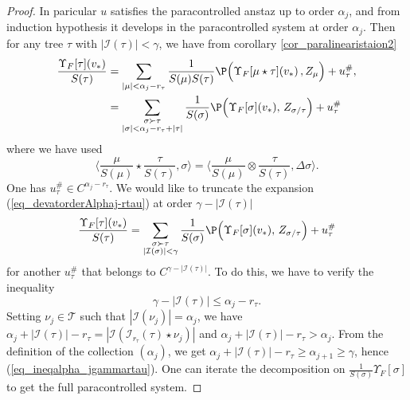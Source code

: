 \documentclass[11pt]{preprint}
\newcommand{\mcI}{\mathcal{I}}
\newcommand{\mcT}{\mathcal{T}}
\def\eqref#1{(\ref{#1})}
\begin{document}
\begin{proof}
	In paricular $u$ satisfies the paracontrolled anstaz up to order $\alpha_j$, and from induction hypothesis it develops in the paracontrolled system at order $\alpha_j$.
	 Then for any tree $\tau$ with $|\mcI(\tau)|<\gamma$, we have from corollary \ref{cor_paralinearistaion2}
		\begin{equation*}\label{eq_devatorderAlphaj-rtau}
			\begin{aligned}
		\frac{\Upsilon_F[\tau](v_*)}{S(\tau)} 
		 & = \sum_{\substack{ |\mu|<\alpha_j-r_\tau}} \frac{1}{S(\mu) S(\tau)}\P\Big(  \Upsilon_F[\mu \star \tau](v_*)  \, ,Z_\mu\Big)  + u_\tau^\#,
		\\& = \sum_{\substack{\sigma \succ\tau \\ |\sigma|<\alpha_j-r_\tau+|\tau|  }} \frac{1}{S(\sigma)}\P\Big(\Upsilon_F[\sigma](v_*), \, Z_{\sigma/\tau}\Big)  + u_\tau^\# %
		\end{aligned}
		\end{equation*}
		where we have used
	\begin{equation*}
		\langle \frac{\mu}{S(\mu)} \star  \frac{\tau}{S(\tau)} , \sigma  \rangle  = \langle \frac{\mu}{S(\mu)} \otimes  \frac{\tau}{S(\tau)} , \Delta \sigma  \rangle.
	\end{equation*}
		One has $u_\tau^\#\in C^{\alpha_j-r_\tau}$. We would like to truncate the expansion \eqref{eq_devatorderAlphaj-rtau} at order $\gamma-|\mcI(\tau)|$
		$$
		\frac{\Upsilon_F[\tau](v_*)}{S(\tau)} 
		= \sum_{\substack{\sigma \succ\tau \\ |\mcI(\sigma)|<\gamma  }} \frac{1}{S(\sigma)}\P\Big(\Upsilon_F[\sigma](v_*), \, Z_{\sigma/\tau}\Big)  + u_\tau^\# %
		$$
		for another $u_\tau^\#$ that belongs to $C^{\gamma-|\mcI(\tau)|}$. To do this, we have to verify the inequality \begin{equation}\label{eq_ineqalpha_jgammartau}\gamma-|\mcI(\tau)|\leq \alpha_j-r_\tau.
		\end{equation} 
		Setting $\nu_j\in\mcT$ such that $|\mcI(\nu_j)|=\alpha_j$, we have $\alpha_j+|\mcI(\tau)|-r_\tau=|\mcI(  \mcI_{r_\tau}(\tau) \star \nu_j  )|$ and $\alpha_j+|\mcI(\tau)|-r_\tau>\alpha_j$. 
		From the definition of the collection $(\alpha_j)$, we get $\alpha_j+|\mcI(\tau)|-r_\tau\geq\alpha_{j+1}\geq \gamma$, hence \eqref{eq_ineqalpha_jgammartau}.
One can iterate the decomposition on  $ \frac{1}{S(\sigma) }\Upsilon_F[\sigma ]  $ to get the full paracontrolled system.
	\end{proof}
	
\end{document}
